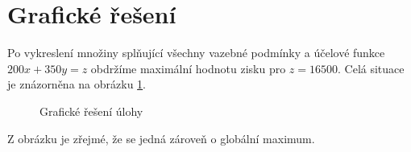 \documentclass[../sablona-main.tex]{subfiles}
\begin{document}
	\section{Grafické řešení}
	Po vykreslení množiny splňující všechny vazebné podmínky a účelové funkce $200x+350y=z$ obdržíme maximální hodnotu zisku pro $z=16500$. Celá situace je znázorněna na obrázku \ref{fig: Graficke reseni}.
	\begin{figure}[H]
		\centering
		
		\caption{Grafické řešení úlohy} \label{fig: Graficke reseni}
	\end{figure}
	Z obrázku je zřejmé, že se jedná zároveň o globální maximum.
\end{document}
